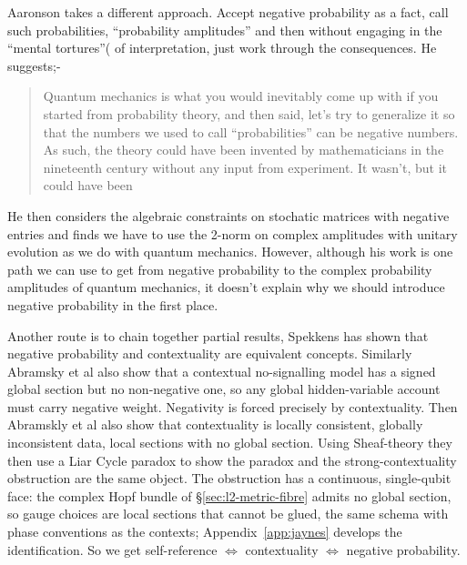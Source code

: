 Aaronson \autocites{aaronson_lect9}[ch.~9]{Aaronson:dem} takes a different approach. Accept negative
probability as a fact, call such probabilities, \enquote{probability amplitudes} and then without 
engaging in the \enquote{mental tortures}(\autocite{Cardano_1545} of interpretation, just work 
through the consequences. He suggests;-
\begin{quotation}
Quantum mechanics is what you would inevitably come up with if you started from probability
theory, and then said, let's try to generalize it so that the numbers we used to call
\enquote{probabilities} can be negative numbers. As such, the theory could have been invented by
mathematicians in the nineteenth century without any input from experiment. It wasn't, but it
could have been
     \par
\hfill \autocite[ch.~9]{Aaronson:dem}
\end{quotation}
He then considers the algebraic constraints on stochatic matrices with negative entries and
finds we have to use the 2-norm on complex amplitudes with unitary evolution as we do with
quantum mechanics. However, although his work is one path we can use to get from negative
probability to the complex probability amplitudes of quantum mechanics, it doesn't explain why
we should introduce negative probability in the first place.

Another route is to chain together partial results, Spekkens \autocite{spekkens2008negativity}
has shown that negative probability and contextuality are equivalent concepts. Similarly
Abramsky et al \autocite{Abramsky2014} also show that a contextual no-signalling model has a
signed global section but no non-negative one, so any global hidden-variable account must carry
negative weight. Negativity is forced precisely by contextuality. Then Abramskly et al
\autocite{Abramsky2015} also show that contextuality is locally consistent, globally
inconsistent data, local sections with no global section. Using Sheaf-theory they then use a
Liar Cycle paradox to show the paradox and the strong-contextuality obstruction are the same
object. The obstruction has a continuous, single-qubit face: the complex Hopf bundle of
\S\ref{sec:l2-metric-fibre} admits no global section, so gauge choices are local sections that
cannot be glued, the same schema with phase conventions as the contexts;
Appendix~\ref{app:jaynes} develops the identification. So we get
self-reference $\iff$ contextuality $\iff$ negative probability.

